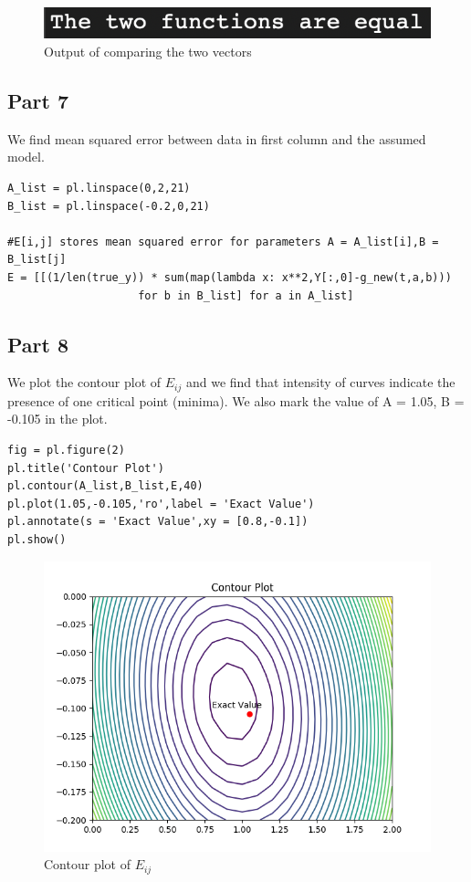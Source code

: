 \documentclass[11pt, a4paper]{article}
\begin{document}
\begin{figure}[!htb]
   	\centering
   	\includegraphics[scale=0.5]{isEqual.png}
   	\caption{Output of comparing the two vectors}
   	\label{fig:eisEqual}
\end{figure}

\subsection{Part 7}
We find mean squared error between data in first column and the assumed model.
\begin{verbatim}
A_list = pl.linspace(0,2,21)
B_list = pl.linspace(-0.2,0,21)

#E[i,j] stores mean squared error for parameters A = A_list[i],B = B_list[j]
E = [[(1/len(true_y)) * sum(map(lambda x: x**2,Y[:,0]-g_new(t,a,b))) 
					for b in B_list] for a in A_list]
\end{verbatim}

\subsection{Part 8}
We plot the contour plot of $E_{ij}$ and we find that intensity of curves indicate the presence of one critical point (minima). We also mark the value of A = 1.05, B = -0.105 in the plot.
\begin{verbatim}
fig = pl.figure(2)
pl.title('Contour Plot')
pl.contour(A_list,B_list,E,40)
pl.plot(1.05,-0.105,'ro',label = 'Exact Value')
pl.annotate(s = 'Exact Value',xy = [0.8,-0.1])
pl.show()
\end{verbatim}

\begin{figure}[!htb]
   	\centering
   	\includegraphics[scale=0.5]{contour.png}
   	\caption{Contour plot of $E_{ij}$}
   	\label{fig:contour}
\end{figure}
\end{document}
